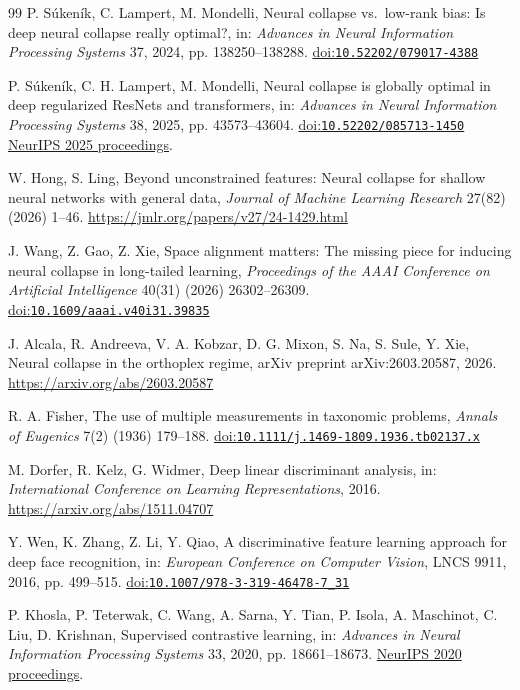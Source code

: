 \documentclass[10pt,a4paper,twocolumn]{article}
\providecommand{\doi}[1]{%
  \href{https://doi.org/#1}{doi:\nolinkurl{#1}}}
\begin{document}
\begin{thebibliography}{99}
P. S\'{u}ken\'{i}k, C. Lampert, M. Mondelli,
Neural collapse vs.\ low-rank bias: Is deep neural collapse really optimal?,
in: \emph{Advances in Neural Information Processing Systems}
37, 2024, pp. 138250--138288.
\doi{10.52202/079017-4388}

P. S\'{u}ken\'{i}k, C. H. Lampert, M. Mondelli,
Neural collapse is globally optimal in deep regularized ResNets and transformers,
in: \emph{Advances in Neural Information Processing Systems}
38, 2025, pp. 43573--43604.
\doi{10.52202/085713-1450}
\href{https://proceedings.neurips.cc/paper_files/paper/2025/hash/3e18f7152b5e1696e73722dc5121b6f2-Abstract-Conference.html}{NeurIPS 2025 proceedings}.

W. Hong, S. Ling,
Beyond unconstrained features: Neural collapse for shallow neural networks
with general data,
\emph{Journal of Machine Learning Research} 27(82) (2026) 1--46.
\url{https://jmlr.org/papers/v27/24-1429.html}

J. Wang, Z. Gao, Z. Xie,
Space alignment matters: The missing piece for inducing
neural collapse in long-tailed learning,
\emph{Proceedings of the AAAI Conference on Artificial Intelligence}
40(31) (2026) 26302--26309.
\doi{10.1609/aaai.v40i31.39835}

J. Alcala, R. Andreeva, V. A. Kobzar, D. G. Mixon,
S. Na, S. Sule, Y. Xie,
Neural collapse in the orthoplex regime,
arXiv preprint arXiv:2603.20587, 2026.
\url{https://arxiv.org/abs/2603.20587}

R. A. Fisher,
The use of multiple measurements in taxonomic problems,
\emph{Annals of Eugenics} 7(2) (1936) 179--188.
\doi{10.1111/j.1469-1809.1936.tb02137.x}

M. Dorfer, R. Kelz, G. Widmer,
Deep linear discriminant analysis,
in: \emph{International Conference on Learning Representations}, 2016.
\url{https://arxiv.org/abs/1511.04707}

Y. Wen, K. Zhang, Z. Li, Y. Qiao,
A discriminative feature learning approach for deep face recognition,
in: \emph{European Conference on Computer Vision}, LNCS 9911, 2016, pp. 499--515.
\doi{10.1007/978-3-319-46478-7_31}

P. Khosla, P. Teterwak, C. Wang, A. Sarna, Y. Tian,
P. Isola, A. Maschinot, C. Liu, D. Krishnan,
Supervised contrastive learning,
in: \emph{Advances in Neural Information Processing Systems}
33, 2020, pp. 18661--18673.
\href{https://proceedings.neurips.cc/paper/2020/hash/d89a66c7c80a29b1bdbab0f2a1a94af8-Abstract.html}
{NeurIPS 2020 proceedings}.


\end{thebibliography}
\end{document}
